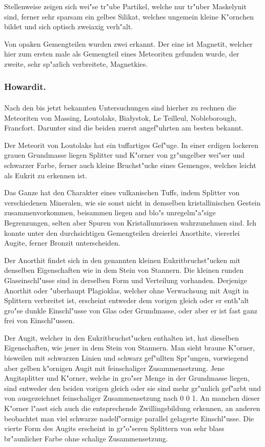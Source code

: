 \documentclass[a4paper, 11pt, oneside, polutonikogreek, german]{article}
\begin{document}
Stellenweise zeigen sich wei"se tr"ube Partikel, welche nur tr"uber Maskelynit sind, ferner sehr sparsam ein gelbes Silikat, welches ungemein kleine K"ornchen bildet und sich optisch zweiaxig verh"alt.

Von opaken Gemengteilen wurden zwei erkannt. Der eine ist Magnetit, welcher hier zum ersten male als Gemengteil eines Meteoriten gefunden wurde, der zweite, sehr sp"arlich verbreitete, Magnetkies.

\subsubsection{Howardit.}
\paragraph{}
Nach den bis jetzt bekannten Untersuchungen sind hierher zu rechnen die Meteoriten von Massing, Loutolaks, Białystok, Le Teilleul, Nobleborough, Francfort. Darunter sind die beiden zuerst angef"uhrten am besten bekannt.

Der Meteorit von Loutolaks hat ein tuffartiges Gef"uge. In einer erdigen lockeren grauen Grundmasse liegen Splitter und K"orner von gr"ungelber wei"ser und schwarzer Farbe, ferner auch kleine Bruchst"ucke eines Gemenges, welches leicht als Eukrit zu erkennen ist.

Das Ganze hat den Charakter eines vulkanischen Tuffs, indem Splitter von verschiedenen Mineralen, wie sie sonst nicht in demselben kristallinischen Gestein zusammenvorkommen, beisammen liegen and blo"s unregelm"a"sige Begrenzungen, selten aber Spuren von Kristallumrissen wahrzunehmen sind. Ich konnte unter den durchsichtigen Gemengteilen dreierlei Anorthite, viererlei Augite, ferner Bronzit unterscheiden.

Der Anorthit findet sich in den genannten kleinen Eukritbruchst"ucken mit denselben Eigenschaften wie in dem Stein von Stannern. Die kleinen runden Glaseinschl"usse sind in derselben Form und Verteilung vorhanden. Derjenige Anorthit oder "uberhaupt Plagioklas, welcher ohne Verwachsung mit Augit in Splittern verbreitet ist, erscheint entweder dem vorigen gleich oder er enth"alt gro"se dunkle Einschl"usse von Glas oder Grundmasse, oder aber er ist fast ganz frei von Einschl"ussen.

Der Augit, welcher in den Eukritbruchst"ucken enthalten ist, hat dieselben Eigenschaften, wie jener in dem Stein von Stannern. Man sieht braune K"orner, bisweilen mit schwarzen Linien und schwarz gef"ullten Spr"ungen, vorwiegend aber gelben k"ornigen Augit mit feinschaliger Zusammensetzung. Jene Augitsplitter und K"orner, welche in gro"ser Menge in der Grundmasse liegen, sind entweder den beiden vorigen gleich oder sie sind mehr gr"unlich gef"arbt und von ausgezeichnet feinschaliger Zusammensetzung nach 0 0 1. An manchen dieser K"orner l"asst sich auch die entsprechende Zwillingsbildung erkennen, an anderen beobachtet man viel schwarze nadelf"ormige parallel gelagerte Einschl"usse. Die vierte Form des Augits erscheint in gr"o"seren Splittern von sehr blass br"aunlicher Farbe ohne schalige Zusammensetzung.
\end{document}
